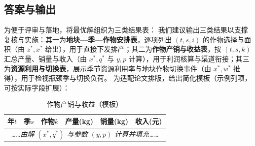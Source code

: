 \subsection{答案与输出}
为便于评审与落地，将最优解组织为三类结果表：
我们建议输出三类结果以支撑复核与实施：其一为\textbf{地块—季—作物安排表}，逐项列出 $(t,s,i)$ 的作物选择与面积（由 $z^*,x^*$ 给出），用于直接下发排产；其二为\textbf{作物产销与收益表}，按 $(t,s,k)$ 汇总产量、销量与收入（由 $x^*,q^*$ 与 $y,p$ 计算），用于利润核算与渠道衔接；其三为\textbf{资源利用与切换表}，展示季节资源利用率与地块作物切换事件（由 $x^*,w^*$ 推得），用于检视瓶颈季与切换负荷。
为适配论文排版，给出简化模板（示例列项，可按实际字段扩展）：
\begin{table}[H]\centering
  \caption{作物产销与收益（模板）}\label{tab:out-sales}
  \begin{tabular}{@{}cccccc@{}}\toprule
    年$t$ & 季$s$ & 作物$k$ & 产量(kg) & 销量(kg) & 收入(元) \\\midrule
    \multicolumn{6}{c}{\emph{……由解 $(x^*,q^*)$ 与参数 $(y,p)$ 计算并填充……}} \\\bottomrule
  \end{tabular}
\end{table}


